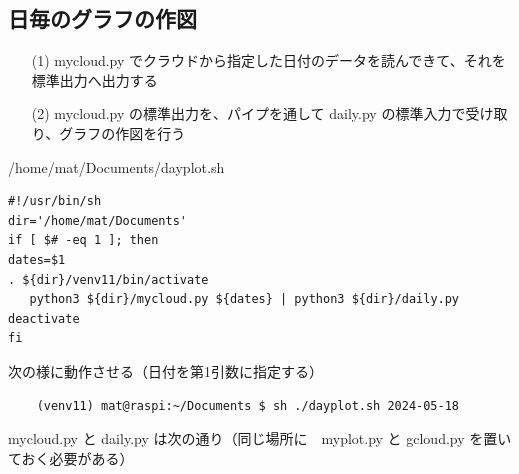 \documentclass[12pt,a4j]{jsbook}
\begin{document}
\subsection{日毎のグラフの作図}

\begin{enumerate}
\item[(1)] mycloud.py でクラウドから指定した日付のデータを読んできて、それを標準出力へ出力する
\item[(2)] mycloud.py の標準出力を、パイプを通して daily.py の標準入力で受け取り、グラフの作図を行う
\end{enumerate}

\begin{spacing}{0.95}
\begin{itembox}[l]{/home/mat/Documents/dayplot.sh}
\begin{verbatim}
#!/usr/bin/sh
dir='/home/mat/Documents'
if [ $# -eq 1 ]; then
dates=$1
. ${dir}/venv11/bin/activate
   python3 ${dir}/mycloud.py ${dates} | python3 ${dir}/daily.py
deactivate
fi
\end{verbatim}
\end{itembox}
\end{spacing}

次の様に動作させる（日付を第1引数に指定する）

\begin{spacing}{0.95}
\begin{screen}
\begin{verbatim}
	(venv11) mat@raspi:~/Documents $ sh ./dayplot.sh 2024-05-18
\end{verbatim}
\end{screen}
\end{spacing}

mycloud.py と daily.py は次の通り（同じ場所に　myplot.py と gcloud.py を置いておく必要がある）
\end{document}
